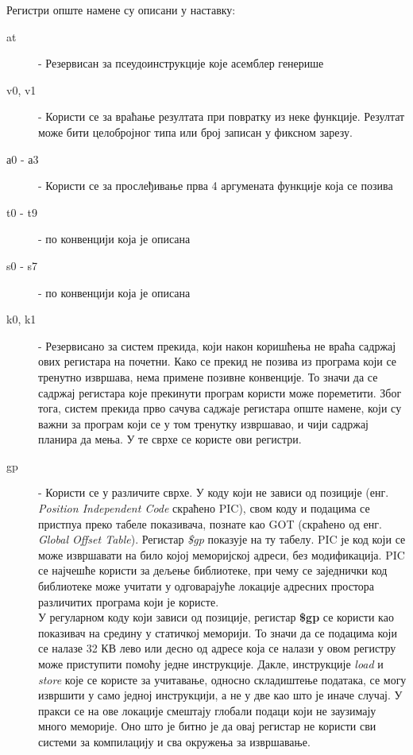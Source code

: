 \documentclass[12pt,oneside]{memoir}
\begin{document}
Регистри опште намене су описани у наставку:
\begin{description}
  \item[at] - Резервисан за псеудоинструкције које асемблер генерише
  \item[v0, v1] - Користи се за враћање резултата при повратку из неке функције. Резултат може бити целобројног типа или број записан у фиксном зарезу.
  \item[а0 - а3] - Користи се за прослеђивање прва 4 аргумената функције која се позива
  \item[t0 - t9] - по конвенцији која је описана 
  \item[s0 - s7] - по конвенцији која је описана 
  \item[k0, k1] - Резервисано за систем прекида, који након коришћења не враћа садржај ових регистара на почетни. Како се прекид не позива из програма који се тренутно извршава, нема примене позивне конвенције. То значи да се садржај регистара које прекинути програм користи може пореметити. Због тога, систем прекида прво сачува саджаје регистара опште намене, који су важни за програм који се у том тренутку извршавао, и чији садржај планира да мења. У те сврхе се користе ови регистри.
  \item[gp] - Користи се у различите сврхе. У коду који  не зависи од позиције (енг. \textit{Position Independent Code} скраћено PIC), свом коду и подацима се пристпуа преко табеле показивача, познате као GOT (скраћено од енг. \textit{Global Offset Table}). Регистар \textit{\$gp} показује на ту табелу. PIC је код који се може извршавати на било којој меморијској адреси, без модификација. PIC се најчешће користи за дељење библиотеке, при чему се заједнички код библиотеке може учитати у одговарајуће локације адресних простора различитих програма који је користе. \\
  У регуларном коду који зависи од позиције, регистар \textbf{\$gp} се користи као показивач на средину у статичкој меморији. То значи да се подацима који се налазе 32 КВ лево или десно од адресе која се налази у овом регистру може приступити помоћу једне инструкције. Дакле, инструкције \textit{load} и \textit{store} које се користе за учитавање, односно складиштење података, се могу извршити у само једној инструкцији, а не у две као што је иначе случај. У пракси се на ове локације смештају глобали подаци који не заузимају много меморије. Оно што је битно је да овај регистар не користи сви системи за компилацију и сва окружења за извршавање.
  

\end{description}
\end{document}
